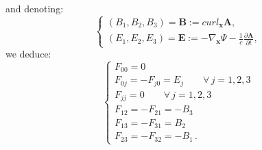 \documentclass{article}
\theoremstyle{definition}
\theoremstyle{remark}
\renewcommand{\vec}[1]{\mathbf{#1}}
\newcommand{\er}{\eqref}
\newcommand{\er}{\eqref}
\begin{document}
%
%
%
and denoting:
\begin{equation}\label{MaxVacFull1bjkgjhjhgjgjgkjfhjfdghghligioiuittrPPNkkkint}
\begin{cases}
(B_1,B_2,B_3)=\vec B:= curl_{\vec x} \vec A,\\
(E_1,E_2,E_3)=\vec E:=-\nabla_{\vec
x}\Psi-\frac{1}{c}\frac{\partial\vec A}{\partial t},
\end{cases}
\end{equation}
we deduce:
\begin{equation}\label{huohuioy89gjjhjffffff3478zzrrZZZhjhhjhhjjhhffGGhjjhiuuijkjjkint}
\begin{cases}
F_{00}=0\\ F_{0j}=-F_{j0}=E_j\quad\quad\forall\, j=1,2,3\\
F_{jj}=0\quad\quad\forall\, j=1,2,3
\\
F_{12}=-F_{21}=-B_3
\\
F_{13}=-F_{31}=B_2
\\
F_{23}=-F_{32}=-B_1\,.
\end{cases}
\end{equation}
\end{document}
